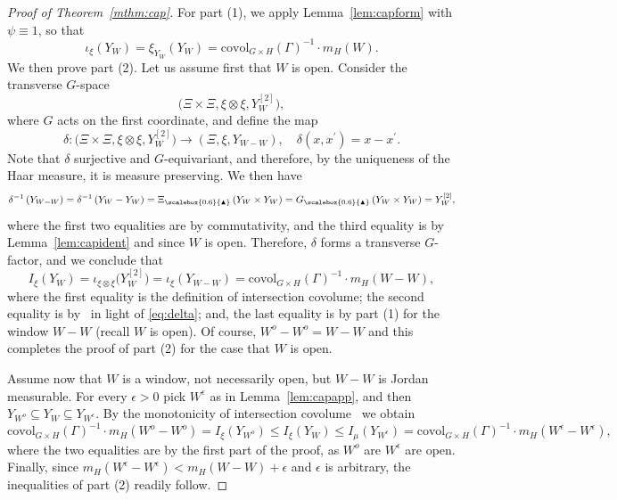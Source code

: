 \documentclass{amsart}
\numberwithin{equation}{subsection}
\theoremstyle{remark}
\newcommand{\diag}{\textsubscript{\raisebox{0.4ex}{\scalebox{0.6}{\(\blacktriangle\)}}}}\xspace
\begin{document}
\begin{proof}[Proof of Theorem~\ref{mthm:cap}]
For part (1), we apply Lemma~\ref{lem:capform} with \(\psi\equiv 1\), so that
\[\iota_{\xi}\left(Y_{W}\right)=\xi_{Y_{W}}\left(Y_{W}\right)=\mathrm{covol}_{G\times H}\left(\Gamma\right)^{-1}\cdot m_{H}\left(W\right).\]
We then prove part (2). Let us assume first that \(W\) is open. Consider the transverse \(G\)-space
\[\big(\Xi\times\Xi,\xi\otimes\xi,Y_{W}^{\left[2\right]}\big),\]
where \(G\) acts on the first coordinate, and define the map
\[\delta:\big(\Xi\times\Xi,\xi\otimes\xi,Y_{W}^{\left[2\right]}\big)\longrightarrow\left(\Xi,\xi,Y_{W-W}\right),\quad \delta\left(x,x^{\prime}\right)=x-x^{\prime}.\]
Note that \(\delta\) surjective and \(G\)-equivariant, and therefore, by the uniqueness of the Haar measure, it is measure preserving. We then have
\begin{equation}\label{eq:delta}
\delta^{-1}\left(Y_{W-W}\right)=\delta^{-1}\left(Y_{W}-Y_{W}\right)=\Xi\diag\left(Y_{W}\times Y_{W}\right)=G\diag\left(Y_{W}\times Y_{W}\right)=Y_{W}^{\left[2\right]},
\end{equation}
where the first two equalities are by commutativity, and the third equality is by Lemma~\ref{lem:capident} and since \(W\) is open. Therefore, \(\delta\) forms a transverse \(G\)-factor, and we conclude that
\[I_{\xi}\left(Y_{W}\right)=\iota_{\xi\otimes\xi}\big(Y_{W}^{\left[2\right]}\big)=\iota_{\xi}\left(Y_{W-W}\right)=\mathrm{covol}_{G\times H}\left(\Gamma\right)^{-1}\cdot m_{H}\left(W-W\right),\]
where the first equality is the definition of intersection covolume; the second equality is by~\cite[Proposition 7.5]{AvBjCuI} in light of \eqref{eq:delta}; and, the last equality is by part (1) for the window \(W-W\) (recall \(W\) is open). Of course, \(W^{o}-W^{o}=W-W\) and this completes the proof of part (2) for the case that \(W\) is open.

Assume now that \(W\) is a window, not necessarily open, but \(W-W\) is Jordan measurable. For every \(\epsilon>0\) pick \(W^{\epsilon}\) as in Lemma~\ref{lem:capapp}, and then \(Y_{W^{o}}\subseteq Y_{W}\subseteq Y_{W^{\epsilon}}\). By the monotonicity of intersection covolume~\cite[Proposition 7.1]{AvBjCuI} we obtain
\[\mathrm{covol}_{G\times H}\left(\Gamma\right)^{-1}\cdot m_{H}\left(W^{o}-W^{o}\right)=I_{\xi}\left(Y_{W^{o}}\right)\leq I_{\xi}\left(Y_{W}\right)\leq I_{\mu}\left(Y_{W^{\epsilon}}\right)=\mathrm{covol}_{G\times H}\left(\Gamma\right)^{-1}\cdot m_{H}\left(W^{\epsilon}-W^{\epsilon}\right),\]
where the two equalities are by the first part of the proof, as \(W^{o}\) are \(W^{\epsilon}\) are open. Finally, since \(m_{H}\left(W^{\epsilon}-W^{\epsilon}\right)<m_{H}\left(W-W\right)+\epsilon\) and \(\epsilon\) is arbitrary, the inequalities of part (2) readily follow.
\end{proof}
\end{document}
